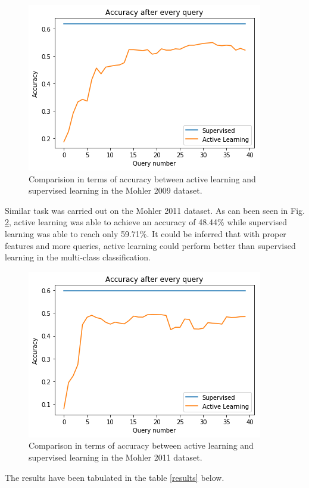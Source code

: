 \begin{figure}[h]
	\centering
	\includegraphics[scale=0.7]{images/m1_multi}
	\caption{Comparision in terms of accuracy between active learning and supervised learning in the Mohler 2009 dataset.}
	\label{m1_multi}
\end{figure}

Similar task was carried out on the Mohler 2011 dataset. As can been seen in Fig. \ref{m2_multi}, active learning was able to achieve an accuracy of 48.44\% while supervised learning was able to reach only 59.71\%. It could be inferred that with proper features and more queries, active learning could perform better than supervised learning in the multi-class classification. \\

\begin{figure}[h!]
	\centering
	\includegraphics[scale=0.7]{images/m2_multi}
	\caption{Comparison in terms of accuracy between active learning and supervised learning in the Mohler 2011 dataset.}
	\label{m2_multi}
\end{figure}


The results have been tabulated in the table \ref{results} below.\\ 

